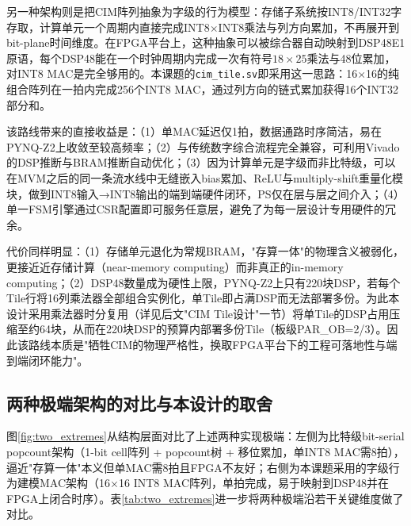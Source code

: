 \documentclass[bachelor,compact,nofont]{xjtuthesis}
\numberwithin{equation}{chapter}
\begin{document}
另一种架构则是把CIM阵列抽象为字级的行为模型：存储子系统按INT8/INT32字存取，计算单元一个周期内直接完成INT8$\times$INT8乘法与列方向累加，不再展开到bit-plane时间维度。在FPGA平台上，这种抽象可以被综合器自动映射到DSP48E1原语，每个DSP48能在一个时钟周期内完成一次有符号$18\times25$乘法与48位累加，对INT8 MAC是完全够用的。本课题的\texttt{cim\_tile.sv}即采用这一思路：16$\times$16的纯组合阵列在一拍内完成256个INT8 MAC，通过列方向的链式累加获得16个INT32部分和。

该路线带来的直接收益是：（1）单MAC延迟仅1拍，数据通路时序简洁，易在PYNQ-Z2上收敛至较高频率；（2）与传统数字综合流程完全兼容，可利用Vivado的DSP推断与BRAM推断自动优化；（3）因为计算单元是字级而非比特级，可以在MVM之后的同一条流水线中无缝嵌入bias累加、ReLU与multiply-shift重量化模块，做到INT8输入→INT8输出的端到端硬件闭环，PS仅在层与层之间介入；（4）单一FSM引擎通过CSR配置即可服务任意层，避免了为每一层设计专用硬件的冗余。

代价同样明显：（1）存储单元退化为常规BRAM，"存算一体"的物理含义被弱化，更接近近存储计算（near-memory computing）而非真正的in-memory computing；（2）DSP48数量成为硬性上限，PYNQ-Z2上只有220块DSP，若每个Tile行将16列乘法器全部组合实例化，单Tile即占满DSP而无法部署多份。为此本设计采用乘法器时分复用（详见后文"CIM Tile设计"一节）将单Tile的DSP占用压缩至约64块，从而在220块DSP的预算内部署多份Tile（板级PAR\_OB=2/3）。因此该路线本质是"牺牲CIM的物理严格性，换取FPGA平台下的工程可落地性与端到端闭环能力"。

\subsection{两种极端架构的对比与本设计的取舍}

图\ref{fig:two_extremes}从结构层面对比了上述两种实现极端：左侧为比特级bit-serial popcount架构（1-bit cell阵列 + popcount树 + 移位累加，单INT8 MAC需8拍），逼近"存算一体"本义但单MAC需8拍且FPGA不友好；右侧为本课题采用的字级行为建模MAC架构（16$\times$16 INT8 MAC阵列，单拍完成，易于映射到DSP48并在FPGA上闭合时序）。表\ref{tab:two_extremes}进一步将两种极端沿若干关键维度做了对比。
\end{document}
